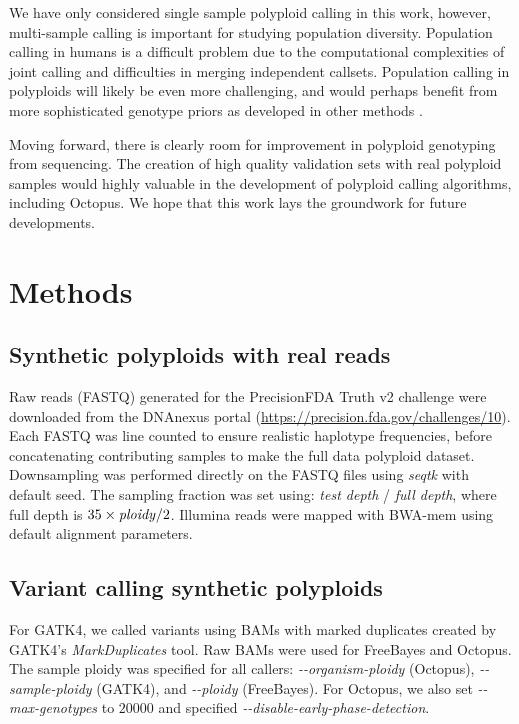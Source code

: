 \documentclass[notitlepage, twocolumn, 10pt]{article}
\begin{document}
We have only considered single sample polyploid calling in this work, however, multi-sample calling is  important for studying population diversity. Population calling in humans is a difficult problem due to the computational complexities of joint calling and difficulties in merging independent callsets. Population calling in polyploids will likely be even more challenging, and would perhaps benefit from  more sophisticated genotype priors as developed in other methods \cite{RN666}.

Moving forward, there is clearly room for improvement in polyploid genotyping from sequencing. The creation of high quality validation sets with real polyploid samples would highly valuable in the development of polyploid calling algorithms, including Octopus. We hope that this work lays the groundwork for future developments.




\section*{Methods}\small

\subsection*{Synthetic polyploids with real reads} Raw reads (FASTQ) generated for the PrecisionFDA Truth v2 challenge were downloaded from the DNAnexus portal (\url{https://precision.fda.gov/challenges/10}). Each FASTQ was line counted to ensure realistic haplotype frequencies, before concatenating contributing samples to make the full data polyploid dataset. Downsampling was performed directly on the FASTQ files using \emph{seqtk} with default seed. The sampling fraction was set using: \emph{test depth} / \emph{full depth}, where full depth is $35 \times \text{\emph{ploidy}} / 2$. Illumina reads were mapped with BWA-mem using default alignment parameters.

\subsection*{Variant calling synthetic polyploids} For GATK4, we called variants using BAMs with marked duplicates created by GATK4's \emph{MarkDuplicates} tool. Raw BAMs were used for FreeBayes and Octopus. The sample ploidy was specified for all callers: \emph{-{}-organism-ploidy} (Octopus), \emph{-{}-sample-ploidy} (GATK4), and \emph{-{}-ploidy} (FreeBayes). For Octopus, we also set \emph{-{}-max-genotypes} to $20000$ and specified \emph{-{}-disable-early-phase-detection}.
\end{document}
